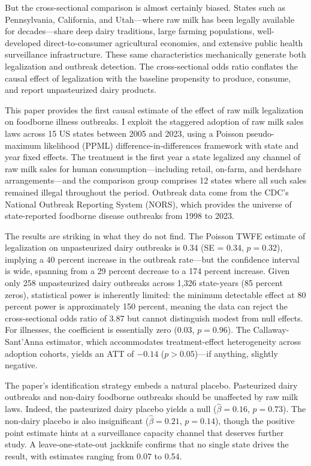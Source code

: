 \documentclass[12pt]{article}
\begin{document}
But the cross-sectional comparison is almost certainly biased. States such as Pennsylvania, California, and Utah---where raw milk has been legally available for decades---share deep dairy traditions, large farming populations, well-developed direct-to-consumer agricultural economies, and extensive public health surveillance infrastructure. These same characteristics mechanically generate both legalization and outbreak detection. The cross-sectional odds ratio conflates the causal effect of legalization with the baseline propensity to produce, consume, and report unpasteurized dairy products.

This paper provides the first causal estimate of the effect of raw milk legalization on foodborne illness outbreaks. I exploit the staggered adoption of raw milk sales laws across 15 US states between 2005 and 2023, using a Poisson pseudo-maximum likelihood (PPML) difference-in-differences framework with state and year fixed effects. The treatment is the first year a state legalized any channel of raw milk sales for human consumption---including retail, on-farm, and herdshare arrangements---and the comparison group comprises 12 states where all such sales remained illegal throughout the period. Outbreak data come from the CDC's National Outbreak Reporting System (NORS), which provides the universe of state-reported foodborne disease outbreaks from 1998 to 2023.

The results are striking in what they do not find. The Poisson TWFE estimate of legalization on unpasteurized dairy outbreaks is 0.34 (SE = 0.34, $p = 0.32$), implying a 40 percent increase in the outbreak rate---but the confidence interval is wide, spanning from a 29 percent decrease to a 174 percent increase. Given only 258 unpasteurized dairy outbreaks across 1,326 state-years (85 percent zeros), statistical power is inherently limited: the minimum detectable effect at 80 percent power is approximately 150 percent, meaning the data can reject the cross-sectional odds ratio of 3.87 but cannot distinguish modest from null effects. For illnesses, the coefficient is essentially zero (0.03, $p = 0.96$). The Callaway-Sant'Anna estimator, which accommodates treatment-effect heterogeneity across adoption cohorts, yields an ATT of $-0.14$ ($p > 0.05$)---if anything, slightly negative.

The paper's identification strategy embeds a natural placebo. Pasteurized dairy outbreaks and non-dairy foodborne outbreaks should be unaffected by raw milk laws. Indeed, the pasteurized dairy placebo yields a null ($\hat{\beta} = 0.16$, $p = 0.73$). The non-dairy placebo is also insignificant ($\hat{\beta} = 0.21$, $p = 0.14$), though the positive point estimate hints at a surveillance capacity channel that deserves further study. A leave-one-state-out jackknife confirms that no single state drives the result, with estimates ranging from 0.07 to 0.54.
\end{document}
